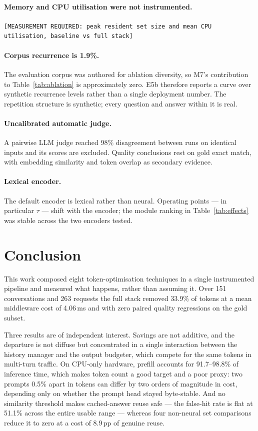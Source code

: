 \documentclass[11pt,a4paper]{article}
\newcommand{\todoval}[1]{\textcolor{accent}{\small\texttt{[MEASUREMENT REQUIRED: #1]}}}
\begin{document}
\paragraph{Memory and CPU utilisation were not instrumented.}
\todoval{peak resident set size and mean CPU utilisation, baseline vs full stack}

\paragraph{Corpus recurrence is 1.9\%.} The evaluation corpus was authored for
ablation diversity, so M7's contribution to Table~\ref{tab:ablation} is
approximately zero. E5b therefore reports a curve over synthetic recurrence
levels rather than a single deployment number. The repetition structure is
synthetic; every question and answer within it is real.

\paragraph{Uncalibrated automatic judge.} A pairwise LLM judge reached 98\%
disagreement between runs on identical inputs and its scores are excluded.
Quality conclusions rest on gold exact match, with embedding similarity and token
overlap as secondary evidence.

\paragraph{Lexical encoder.} The default encoder is lexical rather than neural.
Operating points --- in particular $\tau$ --- shift with the encoder; the module
ranking in Table~\ref{tab:effects} was stable across the two encoders tested.

\section{Conclusion}
\label{sec:conclusion}

This work composed eight token-optimisation techniques in a single instrumented
pipeline and measured what happens, rather than assuming it. Over 151
conversations and 263 requests the full stack removed 33.9\% of tokens at a mean
middleware cost of 4.06\,ms and with zero paired quality regressions on the gold
subset.

Three results are of independent interest. Savings are not additive, and the
departure is not diffuse but concentrated in a single interaction between the
history manager and the output budgeter, which compete for the same tokens in
multi-turn traffic. On CPU-only hardware, prefill accounts for 91.7--98.8\% of
inference time, which makes token count a good target and a poor proxy: two
prompts 0.5\% apart in tokens can differ by two orders of magnitude in cost,
depending only on whether the prompt head stayed byte-stable. And no similarity
threshold makes cached-answer reuse safe --- the false-hit rate is flat at 51.1\%
across the entire usable range --- whereas four non-neural set comparisons reduce
it to zero at a cost of 8.9\,pp of genuine reuse.
\end{document}
